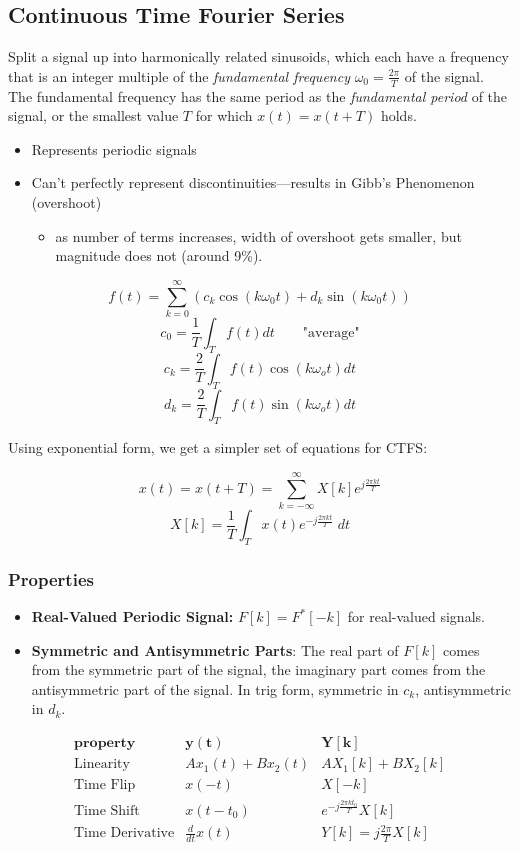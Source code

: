 \documentclass{article}
\begin{document}
\begin{multicols}{2}
\subsection{Continuous Time Fourier Series}
Split a signal up into harmonically related sinusoids, which each have a frequency that is an integer multiple of the \textit{fundamental frequency} $\omega_0 = \frac{2\pi}{T}$ of the signal. The fundamental frequency has the same period as the \textit{fundamental period} of the signal, or the smallest value $T$ for which $x(t) = x(t+T)$ holds.
\begin{itemize}
	\item Represents periodic signals 
	\item Can't perfectly represent discontinuities---results in Gibb's Phenomenon (overshoot)
		\begin{itemize}
			\item as number of terms increases, width of overshoot gets smaller, but magnitude does not (around 9\%).
		\end{itemize}
\end{itemize}

\[ f(t) = \sum_{k=0}^{\infty} (c_k \cos(k\omega_0 t) + d_k\sin(k\omega_0 t)) \]
\[ c_0 = \frac{1}{T}\int_T f(t) dt \qquad \text{"average"} \]
\[ c_k = \frac{2}{T}\int_T f(t) \cos(k\omega_o t) dt \]
\[d_k = \frac{2}{T}\int_T f(t) \sin(k\omega_o t) dt \]

Using exponential form, we get a simpler set of equations for CTFS:

\[ x(t) = x(t+T) = \sum_{k=-\infty}^{\infty} X[k] e^{j\frac{2\pi k t}{T}} \]
\[ X[k] = \frac{1}{T}\int_T x(t) e^{-j\frac{2\pi kt}{T}}\; dt \]

\subsubsection{Properties}
\begin{itemize}
	\item \textbf{Real-Valued Periodic Signal:} $F[k] = F^*[-k]$ for real-valued signals.
	\item \textbf{Symmetric and Antisymmetric Parts}: The real part of $F[k]$ comes from the symmetric part of the signal, the imaginary part comes from the antisymmetric part of the signal. In trig form, symmetric in $c_k$, antisymmetric in $d_k$.
\end{itemize}
\[ \begin{array}{rcc}
	\textbf{property} & \mathbf{y(t)} & \mathbf{Y[k]} \\
	\hline
	\text{Linearity} & Ax_1(t) + Bx_2(t) & AX_1[k] + BX_2[k] \\
	\text{Time Flip} & x(-t) & X[-k] \\
	\text{Time Shift} & x(t-t_0) & e^{-j\frac{2\pi kt_0}{T}} X[k] \\
	\text{Time Derivative} & \frac{d}{dt} x(t) & Y[k] = j\frac{2\pi}{T} X[k] \\
\end{array} \]


\end{multicols}
\end{document}
